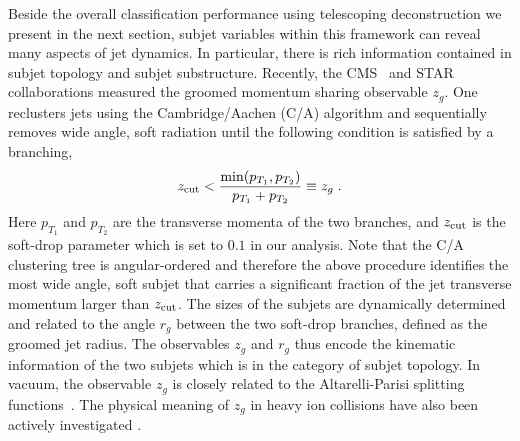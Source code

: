 \documentclass[notoc,preprintnumbers]{JHEP3}
\begin{document}
Beside the overall classification performance using telescoping deconstruction we present in the next section, subjet variables within this framework can reveal many aspects of jet dynamics. In particular, there is rich information contained in subjet topology and subjet substructure. Recently, the CMS~\cite{Sirunyan:2017bsd} and STAR~\cite{Kauder:2017mhg} collaborations measured the groomed momentum sharing observable $z_g$. One reclusters jets using the Cambridge/Aachen (C/A) algorithm \cite{Dokshitzer:1997in,Wobisch:1998wt} and sequentially removes wide angle, soft radiation until the following condition is satisfied by a branching,
\begin{equation}
    z_{\rm cut} < \frac{\min(p_{T_1},p_{T_2})}{p_{T_1}+p_{T_2}} \equiv z_g\;.
\label{SD}
\end{equation}
Here $p_{T_1}$ and $p_{T_2}$ are the transverse momenta of the two branches, and $z_{\rm cut}$ is the soft-drop parameter which is set to $0.1$ in our analysis. Note that the C/A clustering tree is angular-ordered and therefore the above procedure identifies the most wide angle, soft subjet that carries a significant fraction of the jet transverse momentum larger than $z_{\rm cut}$. The sizes of the subjets are dynamically determined and related to the angle $r_g$ between the two soft-drop branches, defined as the groomed jet radius. The observables $z_g$ and $r_g$ thus encode the kinematic information of the two subjets which is in the category of subjet topology. In vacuum, the observable $z_g$ is closely related to the Altarelli-Parisi splitting functions~\cite{Altarelli:1977zs}. The physical meaning of $z_g$ in heavy ion collisions have also been actively investigated \cite{Chien:2016led,Mehtar-Tani:2016aco,Milhano:2017nzm,Chang:2017gkt,Li:2017wwc}.
\end{document}
